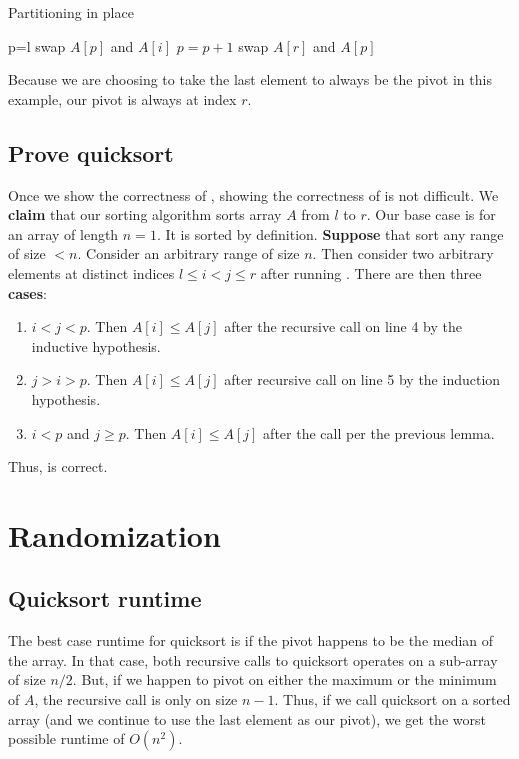 \documentclass[titlepage, 12pt, leqno]{article}
\begin{document}
\begin{algorithm}
\caption{Partitioning in place}
\begin{algorithmic}[1]
    \State p=l
            \State swap $A[p]$ and $A[i]$
            \State $p = p + 1$
        \EndIf
        \State swap $A[r]$ and $A[p]$
    \EndFor
\EndProcedure 
\end{algorithmic}
\end{algorithm}

\begin{note}
    Because we are choosing to take the last element to always be the pivot
    in this example, our pivot is always at index $r$.
\end{note}

\subsection{Prove quicksort}

Once we show the correctness of , showing the correctness of
 is not difficult. We \textbf{claim} that our sorting
algorithm sorts array $A$ from $l$ to $r$. Our base case is for an array of
length $n=1$. It is sorted by definition. \textbf{Suppose} that 
 sort any range of size $<n$. Consider an arbitrary
range of size $n$. Then consider two arbitrary elements at distinct indices
$l \le i < j \le r$ after running . There are then
three \textbf{cases}:
\begin{enumerate}
    \item $i < j< p$. Then $A[i] \le A[j]$ after the recursive call on line 4
        by the inductive hypothesis.
    \item $j > i > p$. Then $A[i] \le A[j]$ after recursive call on line 5 by
        the induction hypothesis.
    \item $i<p$ and $j\ge p$. Then $A[i]\le A[j]$ after the 
        call per the previous lemma.
\end{enumerate}
Thus,  is correct.

\pagebreak
\section{Randomization}
\subsection{Quicksort runtime}
The best case runtime for quicksort is if the pivot happens to be the median of 
the array. In that case, both recursive calls to quicksort operates on a
sub-array of size $n/2$. But, if we happen to pivot on either the maximum or
the minimum of $A$, the recursive call is only on size $n-1$. Thus, if we 
call quicksort on a sorted array (and we continue to use the last element as
our pivot), we get the worst possible runtime of $O(n^{2})$.
\end{document}
